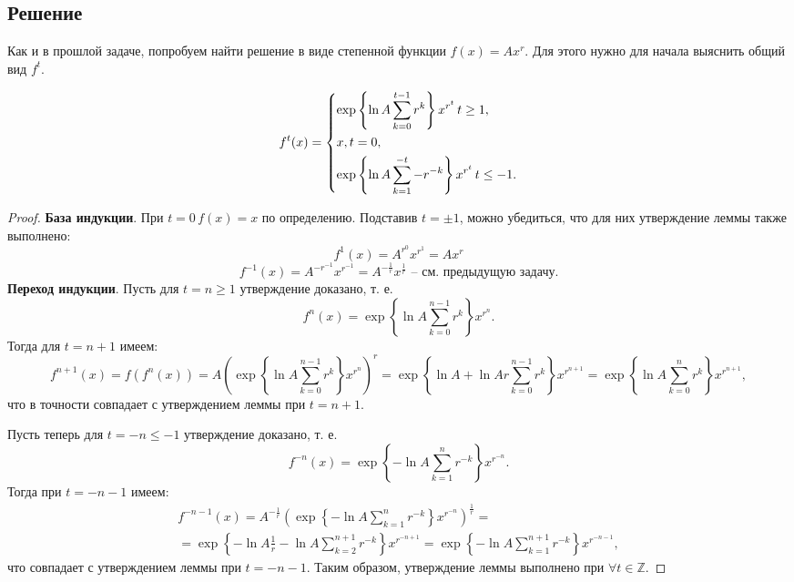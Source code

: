 \documentclass[11pt]{article}
\newcounter{lem}\setcounter{lem}{0}
\def\lm{\par\smallskip\refstepcounter{lem}\textbf{\arabic{lem}}}
\newtheorem*{Lemma}{Лемма \lm}
\newcounter{th}\setcounter{th}{0}
\begin{document}
\subsection{Решение}
\label{sec:org1e55f47}
Как и в прошлой задаче, попробуем найти решение в виде степенной функции \(f(x) = Ax^r\). Для этого нужно для начала выяснить общий вид \(f^t\).

\begin{Lemma}
\begin{equation*}
f^t(x) = \begin{dcases}
\exp\left\{\ln A\sum_{k = 0}^{t - 1}r^k\right\}x^{r^t}\, t \geq 1, \\
x, t = 0, \\
\exp\left\{\ln A\sum_{k = 1}^{-t}-r^{-k}\right\}x^{r^t}\, t \leq -1.
\end{dcases}
\end{equation*}
\end{Lemma}
\begin{proof}
\textbf{База индукции}. При $t = 0\, f(x) = x$ по определению. Подставив $t = \pm 1$, можно убедиться, что для них утверждение леммы также выполнено:
\begin{equation*}
f^1(x) = A^{r^0}x^{r^1} = Ax^r
\end{equation*}
\begin{equation*}
f^{-1}(x) = A^{-r^{-1}}x^{r^{-1}} = A^{-\frac1r}x^{\frac1r} \text{ -- см. предыдущую задачу.}
\end{equation*}
\textbf{Переход индукции}. Пусть для $t = n \geq 1$ утверждение доказано, т. е.
\begin{equation*}
f^n(x) = \exp\left\{\ln A\sum_{k = 0}^{n - 1}r^k\right\}x^{r^n}.
\end{equation*}
Тогда для $t = n + 1$ имеем:
\begin{equation*}
f^{n + 1}(x) = f(f^n(x)) = A\left(\exp\left\{\ln A\sum_{k = 0}^{n - 1}r^k\right\}x^{r^n}\right)^r = \exp\left\{\ln A + \ln Ar\sum_{k = 0}^{n - 1}r^k\right\}x^{r^{n + 1}} = \exp\left\{\ln A\sum_{k = 0}^nr^k\right\}x^{r^{n + 1}},
\end{equation*}
что в точности совпадает с утверждением леммы при $t = n + 1$.

Пусть теперь для $t = -n \leq -1$ утверждение доказано, т. е.
\begin{equation*}
f^{-n}(x) = \exp\left\{-\ln A\sum_{k = 1}^nr^{-k}\right\}x^{r^{-n}}.
\end{equation*}
Тогда при $t = -n - 1$ имеем:
\begin{multline*}
f^{-n - 1}(x) = A^{-\frac1r}\left(\exp\left\{-\ln A\sum_{k = 1}^nr^{-k}\right\}x^{r^{-n}}\right)^\frac1r = \\
= \exp\left\{-\ln A\frac1r - \ln A\sum_{k = 2}^{n + 1}r^{-k}\right\}x^{r^{-n + 1}}
= \exp\left\{-\ln A\sum_{k = 1}^{n + 1}r^{-k}\right\}x^{r^{-n - 1}},
\end{multline*}
что совпадает с утверждением леммы при $t = -n - 1$. Таким образом, утверждение леммы выполнено при $\forall t \in \mathbb{Z}$.
\end{proof}
\end{document}
